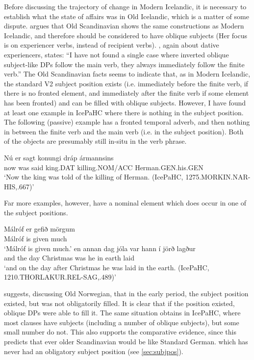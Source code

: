 Before discussing the trajectory of change in Modern Icelandic, it is necessary to establish what the state of affairs was in Old Icelandic, which is a matter of some dispute. \cite{Bardal.1997,Bardal.1998,Bardal.2000,Bardal.2001} argues that Old Scandinavian shows the same constructions as Modern Icelandic, and therefore should be considered to have oblique subjects (Her focus is on experiencer verbs, instead of recipient verbs). \cite{Rognvaldsson.1991}, again about dative experiencers, states: ``I have not found a single case where inverted oblique subject-like DPs follow the main verb, they always immediately follow the finite verb.'' The Old Scandinavian facts seems to indicate that, as in Modern Icelandic, the standard V2 subject position exists (i.e. immediately before the finite verb, if there is no fronted element, and immediately after the finite verb if some element has been fronted) and can be filled with oblique subjects. However, I have found at least one example in IcePaHC where there is nothing in the subject position. The following (passive) example has a fronted temporal adverb, and then nothing in between the finite verb and the main verb (i.e. in the subject position). Both of the objects are presumably still in-situ in the verb phrase.
\begin{exe}
\ex \gll Nú er sagt konungi dráp ármannsins\\
now was said king.DAT killing.NOM/ACC Herman.GEN.his.GEN\\
\trans `Now the king was told of the killing of Herman. (IcePaHC, 1275.MORKIN.NAR-HIS,.667)'
\end{exe}
Far more examples, however, have a nominal element which does occur in one of the subject positions. 
\begin{exe}
\ex
\begin{xlist}
\ex \gll Málróf er gefið mörgum\\
Málróf is given much\\
\trans `Málróf is given much.'
\ex \gll en annan dag jóla var hann í jörð lagður\\
and the day Christmas was he in earth laid\\
\trans `and on the day after Christmas he was laid in the earth. (IcePaHC, 1210.THORLAKUR.REL-SAG,.489)'  
\end{xlist}
\end{exe}
 \cite{Kinn.2010} suggests, discussing Old Norwegian, that in the early period, the subject position existed, but was not obligatorily filled. It is clear that if the position existed, oblique DPs were able to fill it. The same situation obtains in IcePaHC, where most clauses have subjects (including a number of oblique subjects), but some small number do not. This also supports the comparative evidence, since this predicts that ever older Scandinavian would be like Standard German. which has never had an obligatory subject position (see \autoref{sec:subjpos}).

